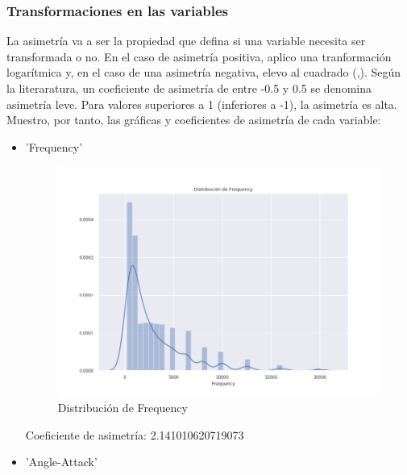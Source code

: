 \subsubsection{Transformaciones en las variables}

La asimetría va a ser la propiedad que defina si una variable necesita ser transformada o no. En el caso de asimetría positiva, aplico una tranformación logarítmica y, en el caso de una asimetría negativa, elevo al cuadrado (\cite{skew1},\cite{skew2}). Según la literaratura, un coeficiente de asimetría de entre -0.5 y 0.5 se denomina asimetría leve. Para valores superiores a 1 (inferiores a -1), la asimetría es alta. Muestro, por tanto, las gráficas y coeficientes de asimetría de cada variable:

\begin{itemize}
	\item 'Frequency'

\begin{figure}[H] %
	\centering
	\includegraphics[scale=0.412]{dist-fr.png}  %
	\caption{Distribución de Frequency} 
	\label{fig:dist-freq}
\end{figure}

Coeficiente de asimetría: 2.141010620719073

\item 'Angle-Attack'


\end{itemize}
